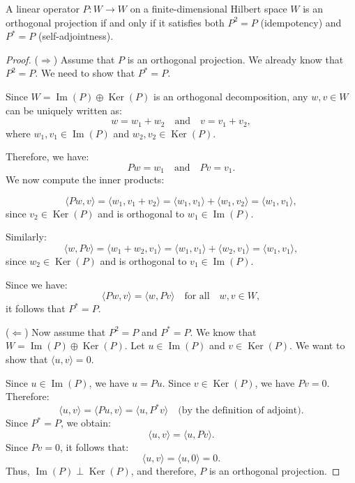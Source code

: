 \begin{proposition}
\label{prop:orthog_proj_char}
A linear operator $P: W \to W$ on a finite-dimensional Hilbert space $W$ is an orthogonal projection if and only if it satisfies both $P^2 = P$ (idempotency) and $P^* = P$ (self-adjointness).
\end{proposition}
\begin{proof}
($\Rightarrow$) Assume that $P$ is an orthogonal projection. We already know that $P^2 = P$. We need to show that $P^* = P$. 

Since $W = \operatorname{Im}(P) \oplus \operatorname{Ker}(P)$ is an orthogonal decomposition, any $w, v \in W$ can be uniquely written as:
\[
w = w_1 + w_2 \quad \text{and} \quad v = v_1 + v_2,
\]
where $w_1, v_1 \in \operatorname{Im}(P)$ and $w_2, v_2 \in \operatorname{Ker}(P)$.

Therefore, we have:
\[
Pw = w_1 \quad \text{and} \quad Pv = v_1.
\]
We now compute the inner products:

\[
\langle Pw, v \rangle = \langle w_1, v_1 + v_2 \rangle = \langle w_1, v_1 \rangle + \langle w_1, v_2 \rangle = \langle w_1, v_1 \rangle,
\]
since $v_2 \in \operatorname{Ker}(P)$ and is orthogonal to $w_1 \in \operatorname{Im}(P)$.

Similarly:
\[
\langle w, Pv \rangle = \langle w_1 + w_2, v_1 \rangle = \langle w_1, v_1 \rangle + \langle w_2, v_1 \rangle = \langle w_1, v_1 \rangle,
\]
since $w_2 \in \operatorname{Ker}(P)$ and is orthogonal to $v_1 \in \operatorname{Im}(P)$.

Since we have:
\[
\langle Pw, v \rangle = \langle w, Pv \rangle \quad \text{for all} \quad w, v \in W,
\]
it follows that $P^* = P$.

($\Leftarrow$) Now assume that $P^2 = P$ and $P^* = P$. We know that $W = \operatorname{Im}(P) \oplus \operatorname{Ker}(P)$. Let $u \in \operatorname{Im}(P)$ and $v \in \operatorname{Ker}(P)$. We want to show that $\langle u, v \rangle = 0$.

Since $u \in \operatorname{Im}(P)$, we have $u = Pu$. Since $v \in \operatorname{Ker}(P)$, we have $Pv = 0$. Therefore:
\[
\langle u, v \rangle = \langle Pu, v \rangle = \langle u, P^*v \rangle \quad \text{(by the definition of adjoint)}.
\]
Since $P^* = P$, we obtain:
\[
\langle u, v \rangle = \langle u, Pv \rangle.
\]
Since $Pv = 0$, it follows that:
\[
\langle u, v \rangle = \langle u, 0 \rangle = 0.
\]
Thus, $\operatorname{Im}(P) \perp \operatorname{Ker}(P)$, and therefore, $P$ is an orthogonal projection.

\end{proof}

